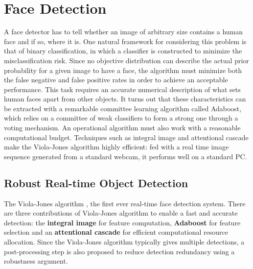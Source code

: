 \chapter{Face Detection} %

\label{Chapter4} %


A face detector has to tell whether an image of arbitrary size contains a human face and if so, where
it is. One natural framework for considering this problem is that of binary classification, in which
a classifier is constructed to minimize the misclassification risk. Since no objective distribution can
describe the actual prior probability for a given image to have a face, the algorithm must minimize
both the false negative and false positive rates in order to achieve an acceptable performance.
This task requires an accurate numerical description of what sets human faces apart from other
objects. It turns out that these characteristics can be extracted with a remarkable committee learning
algorithm called Adaboost, which relies on a committee of weak classifiers to form a strong
one through a voting mechanism. An operational algorithm must also work with a reasonable computational
budget. Techniques such as integral image and attentional cascade make the Viola-Jones algorithm \cite{Viola2004RRF966432}
highly efficient: fed with a real time image sequence generated from a standard webcam, it performs well on a
standard PC.\cite{ipol.2014.104}

\section{Robust Real-time Object Detection}
The Viola-Jones algorithm  \cite{Viola2004RRF966432}, the first ever real-time face detection system.
There are three contributions of Viola-Jones algorithm to enable a fast and accurate detection:
the \textbf{integral image} for feature computation, \textbf{Adaboost} for feature selection and an
\textbf{attentional cascade} for efficient computational resource allocation.
Since the Viola-Jones algorithm typically gives multiple detections,
a post-processing step is also proposed to reduce detection redundancy using a robustness argument.\cite{ipol.2014.104}

